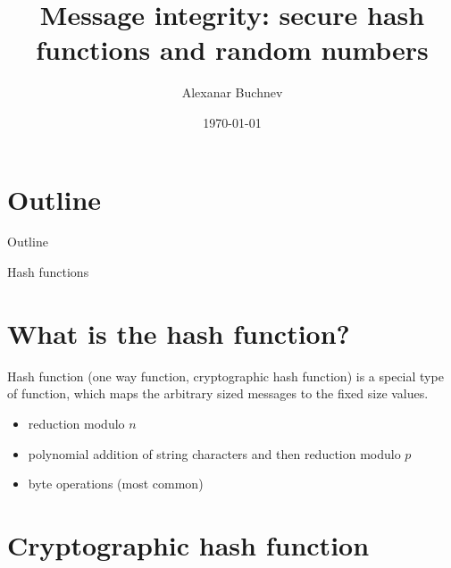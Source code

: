 \documentclass{beamer}
\title{Message integrity: secure hash functions and random numbers}
\author{Alexanar Buchnev}
\date{\monthYear\today}
\begin{document}
\frame{
	\titlepage
}

\newtheorem{prop}{Proposition}


\section*{Outline}

\begin{frame}{Outline}
	\tableofcontents
\end{frame}

\begin{frame}{Hash functions}
    \section{What is the hash function?}
    \begin{definition}
        Hash function (one way function, cryptographic hash function) is a
        special type of function, which maps the arbitrary sized messages to
        the fixed size values.
    \end{definition}
    \begin{example}
        \begin{itemize}
            \item reduction modulo $n$
            \item polynomial addition of string characters and then reduction
            modulo $p$
            \item byte operations (most common)
        \end{itemize}
    \end{example}
\end{frame}

\section{Cryptographic hash function}
\end{document}
